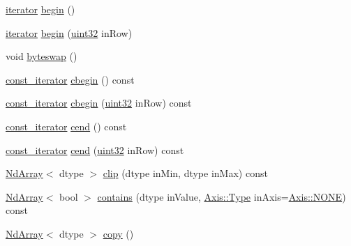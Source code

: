 \begin{DoxyCompactItemize}
\item 
\mbox{\hyperlink{class_num_cpp_1_1_nd_array_ac56493775d6c0ff556ed7d6c9e7c07b4}{iterator}} \mbox{\hyperlink{class_num_cpp_1_1_nd_array_a2c6eb3423503beaf4c70938122c39ea9}{begin}} ()
\item 
\mbox{\hyperlink{class_num_cpp_1_1_nd_array_ac56493775d6c0ff556ed7d6c9e7c07b4}{iterator}} \mbox{\hyperlink{class_num_cpp_1_1_nd_array_a6f3e40957ac38eb4fa0694b03309f525}{begin}} (\mbox{\hyperlink{namespace_num_cpp_a36f388e948380413c63011cab9b7fbd5}{uint32}} in\+Row)
\item 
void \mbox{\hyperlink{class_num_cpp_1_1_nd_array_ad3fb7bfa80870bf4dbdf4829d7666521}{byteswap}} ()
\item 
\mbox{\hyperlink{class_num_cpp_1_1_nd_array_a770eaf3b67efaa19e310ed14eee5aabb}{const\+\_\+iterator}} \mbox{\hyperlink{class_num_cpp_1_1_nd_array_acddd7dd5f95c7e8bd88af5a6cbb6d069}{cbegin}} () const
\item 
\mbox{\hyperlink{class_num_cpp_1_1_nd_array_a770eaf3b67efaa19e310ed14eee5aabb}{const\+\_\+iterator}} \mbox{\hyperlink{class_num_cpp_1_1_nd_array_a9b153131ee4404b83085c3f36a69ef97}{cbegin}} (\mbox{\hyperlink{namespace_num_cpp_a36f388e948380413c63011cab9b7fbd5}{uint32}} in\+Row) const
\item 
\mbox{\hyperlink{class_num_cpp_1_1_nd_array_a770eaf3b67efaa19e310ed14eee5aabb}{const\+\_\+iterator}} \mbox{\hyperlink{class_num_cpp_1_1_nd_array_a3ac81391c206391368f0db78381922a2}{cend}} () const
\item 
\mbox{\hyperlink{class_num_cpp_1_1_nd_array_a770eaf3b67efaa19e310ed14eee5aabb}{const\+\_\+iterator}} \mbox{\hyperlink{class_num_cpp_1_1_nd_array_a709bf281113a7a04638651a48e2700ea}{cend}} (\mbox{\hyperlink{namespace_num_cpp_a36f388e948380413c63011cab9b7fbd5}{uint32}} in\+Row) const
\item 
\mbox{\hyperlink{class_num_cpp_1_1_nd_array}{Nd\+Array}}$<$ dtype $>$ \mbox{\hyperlink{class_num_cpp_1_1_nd_array_a880804796f0f2a03a93b95506fd37291}{clip}} (dtype in\+Min, dtype in\+Max) const
\item 
\mbox{\hyperlink{class_num_cpp_1_1_nd_array}{Nd\+Array}}$<$ bool $>$ \mbox{\hyperlink{class_num_cpp_1_1_nd_array_a48b6225f33c3aebb09a141a7d3969349}{contains}} (dtype in\+Value, \mbox{\hyperlink{struct_num_cpp_1_1_axis_ac10eb76f8631762d9ed70c40c42ca6cb}{Axis\+::\+Type}} in\+Axis=\mbox{\hyperlink{struct_num_cpp_1_1_axis_ac10eb76f8631762d9ed70c40c42ca6cba747ae657022cca1d87702b56d0c038e9}{Axis\+::\+N\+O\+NE}}) const
\item 
\mbox{\hyperlink{class_num_cpp_1_1_nd_array}{Nd\+Array}}$<$ dtype $>$ \mbox{\hyperlink{class_num_cpp_1_1_nd_array_acbd4b7c0367bd41e06e2c9f71dbcf6be}{copy}} ()

\end{DoxyCompactItemize}
